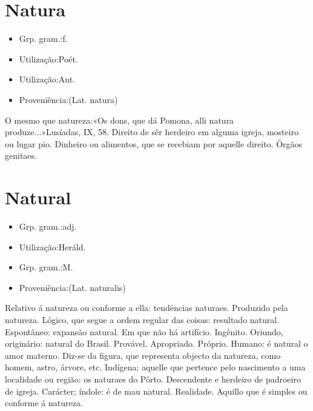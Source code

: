 \section{Natura}
\begin{itemize}
\item {Grp. gram.:f.}
\end{itemize}
\begin{itemize}
\item {Utilização:Poét.}
\end{itemize}
\begin{itemize}
\item {Utilização:Ant.}
\end{itemize}
\begin{itemize}
\item {Proveniência:(Lat. \textunderscore natura\textunderscore )}
\end{itemize}
O mesmo que \textunderscore natureza\textunderscore :«\textunderscore Os dons, que dá Pomona, alli natura produze...\textunderscore »\textunderscore Lusíadas\textunderscore , IX, 58.
Direito de sêr herdeiro em alguma igreja, mosteiro ou lugar pio.
Dinheiro ou alimentos, que se recebiam por aquelle direito.
Órgãos genitaes.
\section{Natural}
\begin{itemize}
\item {Grp. gram.:adj.}
\end{itemize}
\begin{itemize}
\item {Utilização:Heráld.}
\end{itemize}
\begin{itemize}
\item {Grp. gram.:M.}
\end{itemize}
\begin{itemize}
\item {Proveniência:(Lat. \textunderscore naturalis\textunderscore )}
\end{itemize}
Relativo á natureza ou conforme a ella: \textunderscore tendências naturaes\textunderscore .
Produzido pela natureza.
Lógico, que segue a ordem regular das coisas: \textunderscore resultado natural\textunderscore .
Espontâneo: \textunderscore expansão natural\textunderscore .
Em que não há artifício.
Ingênito.
Oriundo, originário: \textunderscore natural do Brasil\textunderscore .
Provável.
Apropriado.
Próprio.
Humano: \textunderscore é natural o amor materno\textunderscore .
Diz-se da figura, que representa objecto da natureza, como homem, astro, árvore, etc.
Indígena; aquelle que pertence pelo nascimento a uma localidade ou região: \textunderscore os naturaes do Pôrto\textunderscore .
Descendente e herdeiro de padroeiro de igreja.
Carácter; índole: \textunderscore é de mau natural\textunderscore .
Realidade.
Aquillo que é simples ou conforme á natureza.
